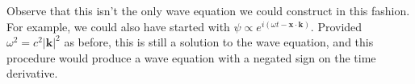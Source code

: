 \documentclass[]{eliblog}
\newcommand{\Abs}[1]{{\left\lvert{#1}\right\rvert}}
\newcommand{\Bk}[0]{\mathbf{k}}
\newcommand{\Bx}[0]{\mathbf{x}}
\begin{document}
Observe that
this isn't the only wave equation we could construct in this fashion.  For example, we could also have started with $\psi \propto e^{i(\omega t - \Bx \cdot \Bk)}$.  Provided $\omega^2 = c^2 \Abs{\Bk}^2$ as before, this is still a solution to the wave equation, and this procedure would produce a wave equation with a negated sign on the time derivative.


%
%
%
%
%
%
\end{document}

